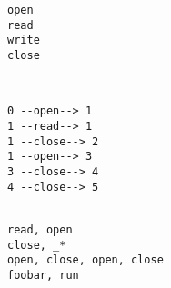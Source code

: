 \documentclass[a4paper]{article}
\begin{document}
\begin{figure}[T]
\begin{Verbatim}[frame=single,label={Operations},framesep=5mm,labelposition=topline]
open
read
write
close
\end{Verbatim}
\begin{Verbatim}[frame=single,label={Necessary},framesep=5mm,labelposition=topline]


\end{Verbatim}
\begin{Verbatim}[frame=single,label={Safe},framesep=5mm,labelposition=topline]
0 --open--> 1
1 --read--> 1
1 --close--> 2
1 --open--> 3
3 --close--> 4
4 --close--> 5


\end{Verbatim}
\begin{Verbatim}[frame=single,label={Forbidden},framesep=5mm,labelposition=topline]
read, open
close, _*
open, close, open, close
foobar, run\end{Verbatim}
\end{figure}
\end{document}
